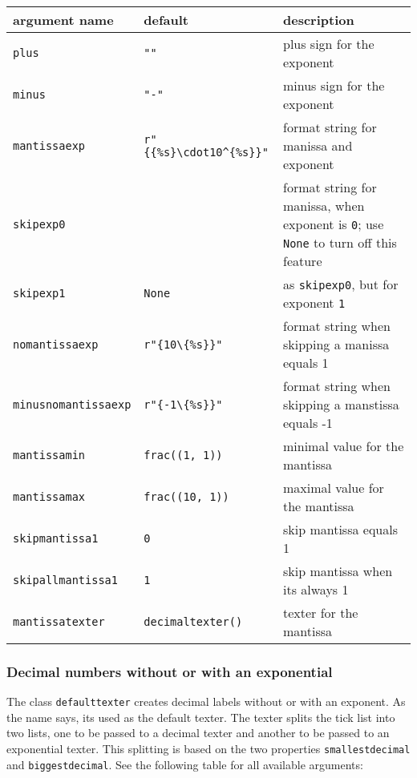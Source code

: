 \medskip
\begin{tabularx}{\linewidth}{ll>{\raggedright\arraybackslash}X}
argument name&default&description\\
\hline
\texttt{plus}&\texttt{""}&plus sign for the exponent\\
\texttt{minus}&\texttt{"-"}&minus sign for the exponent\\
\texttt{mantissaexp}&\texttt{r"\{\{\%s\}\textbackslash cdot10\textasciicircum\{\%s\}\}"}&format string for manissa and exponent\\
\texttt{skipexp0}&\texttt{r"\{\%s\}&format string for manissa, when exponent is \texttt{0}; use \texttt{None} to turn off this feature\\
\texttt{skipexp1}&\texttt{None}&as \texttt{skipexp0}, but for exponent \texttt{1}\\
\texttt{nomantissaexp}&\texttt{r"\{10\textbackslash\{\%s\}\}"}&format string when skipping a manissa equals 1\\
\texttt{minusnomantissaexp}&\texttt{r"\{-1\textbackslash\{\%s\}\}"}&format string when skipping a manstissa equals -1\\
\texttt{mantissamin}&\texttt{frac((1, 1))}&minimal value for the mantissa\\
\texttt{mantissamax}&\texttt{frac((10, 1))}&maximal value for the mantissa\\
\texttt{skipmantissa1}&\texttt{0}&skip mantissa equals 1\\
\texttt{skipallmantissa1}&\texttt{1}&skip mantissa when its always 1\\
\texttt{mantissatexter}&\texttt{decimaltexter()}&texter for the mantissa\\
\end{tabularx}
\medskip

\subsubsection{Decimal numbers without or with an exponential}

The class \verb|defaulttexter| creates decimal labels without or
with an exponent. As the name says, its used as the default texter.
The texter splits the tick list into two lists, one to be passed to a
decimal texter and another to be passed to an exponential texter. This
splitting is based on the two properties \verb|smallestdecimal| and
\verb|biggestdecimal|. See the following table for all available
arguments:

